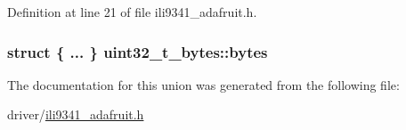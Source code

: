 Definition at line 21 of file ili9341\-\_\-adafruit.\-h.

\hypertarget{unionuint32__t__bytes_a50aeebe398ee3b740421f1cc8d8583b8}{
\subsubsection[{bytes}]{\setlength{\rightskip}{0pt plus 5cm}struct \{ ... \}   uint32\-\_\-t\-\_\-bytes\-::bytes}}\label{unionuint32__t__bytes_a50aeebe398ee3b740421f1cc8d8583b8}


The documentation for this union was generated from the following file\-:\begin{DoxyCompactItemize}
\item 
driver/\hyperlink{ili9341__adafruit_8h}{ili9341\-\_\-adafruit.\-h}\end{DoxyCompactItemize}
